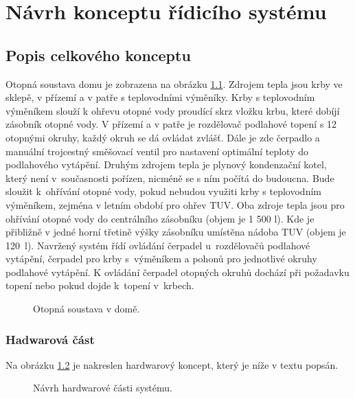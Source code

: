 \chapter{Návrh konceptu řídicího systému}

\section{Popis celkového konceptu}
\label{sec:popis-celkoveho-konceptu}

Otopná soustava domu je zobrazena na obrázku \ref{fig:otopna-soustava-rez-domu}. Zdrojem tepla jsou krby ve sklepě, v přízemí a v patře s teplovodními výměníky. Krby s teplovodním výměníkem slouží k ohřevu otopné vody proudící skrz vložku krbu, které dobíjí zásobník otopné vody. V přízemí a v patře je rozdělovač podlahové topení s 12 otopnými okruhy, každý okruh se dá ovládat zvlášť. Dále je zde čerpadlo a manuální trojcestný směšovací ventil pro nastavení optimální teploty do podlahového vytápění. Druhým zdrojem tepla je plynový kondenzační kotel, který není v~současnosti pořízen, nicméně se s ním počítá do budoucna. Bude sloužit k~ohřívání otopné vody, pokud nebudou využiti krby s teplovodním výměníkem, zejména v letním období pro ohřev TUV. Oba zdroje tepla jsou pro ohřívání otopné vody do centrálního zásobníku (objem je 1 500 l). Kde je přibližně v jedné horní třetině výšky zásobníku umístěna nádoba TUV (objem je 120~l). Navržený systém řídí ovládání čerpadel u~rozdělovačů podlahové vytápění, čerpadel pro krby s~výměníkem a pohonů pro jednotlivé okruhy podlahové vytápění. K ovládání čerpadel otopných okruhů dochází při požadavku topení nebo pokud dojde k~topení v~krbech.


\begin{figure}[H]
    \centering
    \def\svgwidth{\columnwidth}
    
    \caption{Otopná soustava v domě.}
    \label{fig:otopna-soustava-rez-domu}
\end{figure}

\newpage

\subsection{Hadwarová část}

Na obrázku \ref{fig:navrh-hardwarove-casti} je nakreslen hardwarový koncept, který je níže v textu popsán.

\begin{figure}[H]
    \centering
    \def\svgwidth{\columnwidth}
    
    \caption{ Návrh hardwarové části systému.}
    \label{fig:navrh-hardwarove-casti}
\end{figure}

